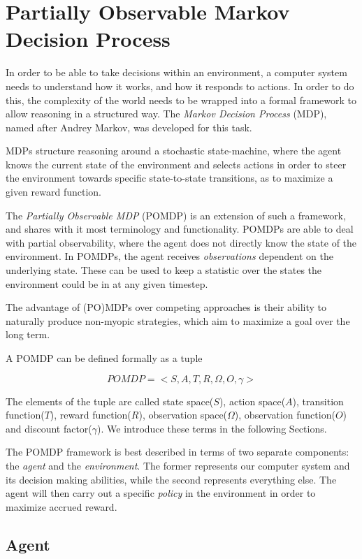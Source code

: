 \section{Partially Observable Markov Decision Process}\label{ref:pomdp}

In order to be able to take decisions within an environment, a computer system needs to understand
how it works, and how it responds to actions. In order to do this, the complexity of the world needs
to be wrapped into a formal framework to allow reasoning in a structured way. The
\textit{Markov Decision Process} (MDP), named after Andrey Markov, was developed for this task.

MDPs structure reasoning around a stochastic state-machine, where the agent knows the current state
of the environment and selects actions in order to steer the environment towards specific
state-to-state transitions, as to maximize a given reward function.

The \textit{Partially Observable MDP} (POMDP) is an extension of such a framework, and shares with it
most terminology and functionality. POMDPs are able to deal with partial observability, where the
agent does not directly know the state of the environment. In POMDPs, the agent receives
\textit{observations} dependent on the underlying state. These can be used to keep a statistic over
the states the environment could be in at any given timestep.

The advantage of (PO)MDPs over competing approaches is their ability to naturally produce non-myopic
strategies, which aim to maximize a goal over the long term.

A POMDP can be defined formally as a tuple

\[ POMDP = <S,A,T,R,\Omega,O,\gamma> \]

The elements of the tuple are called state space($S$), action space($A$), transition function($T$),
reward function($R$), observation space($\Omega$), observation function($O$) and discount
factor($\gamma$). We introduce these terms in the following Sections.

The POMDP framework is best described in terms of two separate components: the \textit{agent} and
the \textit{environment}. The former represents our computer system and its decision making
abilities, while the second represents everything else. The agent will then carry out a specific
\textit{policy} in the environment in order to maximize accrued reward.

\subsection{Agent}


